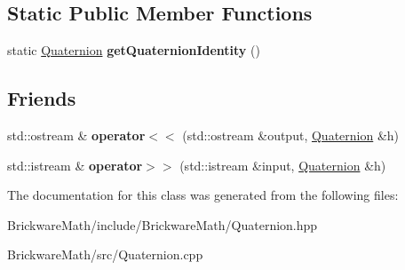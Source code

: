 \subsection*{Static Public Member Functions}
\begin{DoxyCompactItemize}
\item 
\hypertarget{classBrickware_1_1Math_1_1Quaternion_af02af7058e2c0b546b52cab8da75197d}{}static \hyperlink{classBrickware_1_1Math_1_1Quaternion}{Quaternion} {\bfseries get\+Quaternion\+Identity} ()\label{classBrickware_1_1Math_1_1Quaternion_af02af7058e2c0b546b52cab8da75197d}

\end{DoxyCompactItemize}
\subsection*{Friends}
\begin{DoxyCompactItemize}
\item 
\hypertarget{classBrickware_1_1Math_1_1Quaternion_a189bab55994dd384a09634f793b2f26c}{}std\+::ostream \& {\bfseries operator$<$$<$} (std\+::ostream \&output, \hyperlink{classBrickware_1_1Math_1_1Quaternion}{Quaternion} \&h)\label{classBrickware_1_1Math_1_1Quaternion_a189bab55994dd384a09634f793b2f26c}

\item 
\hypertarget{classBrickware_1_1Math_1_1Quaternion_aebb11031050da24c97647f6499f44fd8}{}std\+::istream \& {\bfseries operator$>$$>$} (std\+::istream \&input, \hyperlink{classBrickware_1_1Math_1_1Quaternion}{Quaternion} \&h)\label{classBrickware_1_1Math_1_1Quaternion_aebb11031050da24c97647f6499f44fd8}

\end{DoxyCompactItemize}


The documentation for this class was generated from the following files\+:\begin{DoxyCompactItemize}
\item 
Brickware\+Math/include/\+Brickware\+Math/Quaternion.\+hpp\item 
Brickware\+Math/src/Quaternion.\+cpp\end{DoxyCompactItemize}

